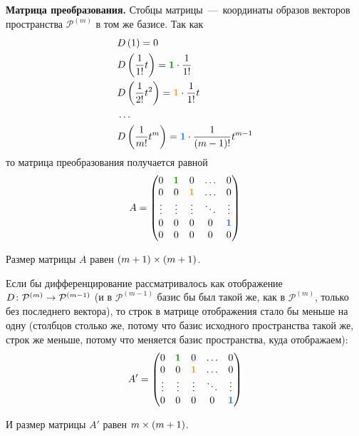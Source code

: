 \documentclass[a4paper,12pt]{article}
\begin{document}
\begin{solution}
    \textbf{Матрица преобразования.}
    Стобцы матрицы~---~координаты образов векторов пространства $\mathcal P^{(m)}$ в том же базисе.
    Так как
    \[
      \begin{aligned}
        &D\left(1\right) = 0\\
        &D\left(\frac{1}{1!} t\right) = \textcolor{green}{\bds 1} \cdot \frac{1}{1!}\\
        &D\left(\frac{1}{2!} t^2\right) = \textcolor{orange}{\bds 1} \cdot \frac{1}{1!} t\\
        &\ldots\\
        &D\left(\frac{1}{m!} t^m\right) = \textcolor{blue}{\bds 1} \cdot \frac{1}{(m - 1)!} t^{m - 1}
      \end{aligned}
    \]
    то матрица преобразования получается равной
    \[
      A = \begin{pmatrix}
        0      & \textcolor{green}{\bds 1} & 0                          & \ldots & 0\\
        0      & 0                         & \textcolor{orange}{\bds 1} & \ldots & 0\\
        \vdots & \vdots                    & \vdots                     & \ddots & \vdots\\
        0      & 0                         & 0                          & 0      & \textcolor{blue}{\bds 1}\\
        0      & 0                         & 0                          & 0      & 0
      \end{pmatrix}
    \]
    
    Размер матрицы $A$ равен $(m \hm+ 1) \hm\times (m \hm+ 1)$.
    
    Если бы дифференцирование рассматривалось как отображение $D \colon \mathcal P^{(m)} \hm\to \mathcal P^{(m - 1)}$ (и в $\mathcal P^{(m - 1)}$ базис бы был такой же, как в $\mathcal P^{(m)}$, только без последнего вектора), то строк в матрице отображения стало бы меньше на одну (столбцов столько же, потому что базис исходного пространства такой же, строк же меньше, потому что меняется базис пространства, куда отображаем):
    \[
      A' = \begin{pmatrix}
        0      & \textcolor{green}{\bds 1} & 0                          & \ldots & 0\\
        0      & 0                         & \textcolor{orange}{\bds 1} & \ldots & 0\\
        \vdots & \vdots                    & \vdots                     & \ddots & \vdots\\
        0      & 0                         & 0                          & 0      & \textcolor{blue}{\bds 1}
      \end{pmatrix}
    \]
    
    И размер матрицы $A'$ равен $m \hm\times (m \hm+ 1)$.
  \end{solution}
  
\end{document}

